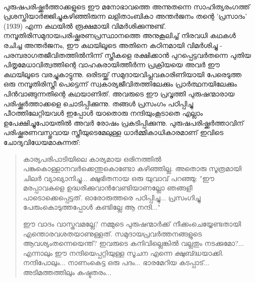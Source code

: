 \paragraph{}പുരുഷപരിഷ്ക്കർത്താക്കളുടെ ഈ മനോഭാവത്തെ അന്നുതന്നെ സാഹിത്യരംഗത്ത് പ്രശസ്തിയാർജ്ജിച്ചുകഴിഞ്ഞിരുന്ന ലളിതാംബികാ അന്തർജനം തന്റെ 'പ്രസാദം' (1939) എന്ന കഥയിൽ രൂക്ഷമായി വിമർശിക്കുന്നുണ്ട്. നമ്പൂതിരിസമുദായപരിഷ്ക്കരണപ്രസ്ഥാനത്തെ അനുകൂലിച്ച് നിരവധി കഥകൾ രചിച്ച അന്തർജനം, ഈ കഥയിലൂടെ അതിനെ കഠിനമായി വിമർശിച്ചു - പരമ്പരാഗതജീവിതത്തിൽനിന്ന് സ്ത്രീകളെ രക്ഷിക്കാൻ പുറപ്പെട്ടവർതന്നെ പുതിയ പിതൃമേധാവിത്വത്തിന്റെ വാഹകരായിത്തീർന്ന പ്രക്രിയയെ അവർ ഈ കഥയിലൂടെ വരച്ചുകാട്ടുന്നു. ഒരിടയ്ക്ക് സമുദായവിപ്ലവകാരിണിയായി പേരെടുത്ത ഒരു നമ്പൂതിരിസ്ത്രീ പെട്ടെന്ന് സ്വകാര്യജീവിതത്തിലേക്കും പ്രാർത്ഥനയിലേക്കും പിൻവാങ്ങുന്നതിന്റെ കഥയാണിത്. അവരുടെ ഈ പ്രവൃത്തി പുരുഷന്മാരായ പരിഷ്ക്കർത്താക്കളെ ചൊടിപ്പിക്കുന്നു. തങ്ങൾ പ്രസംഗം പഠിപ്പിച്ചു പീഠത്തിലേറ്റിയവൾ ഇപ്പോൾ യാതൊരു നന്ദിയുംകൂടാതെ എല്ലാം ഉപേക്ഷിച്ചുപോയതിൽ അവർ രോഷം പ്രകടിപ്പിക്കുന്നു. പുരുഷപരിഷ്ക്കർത്താവിന് പരിഷ്ക്കരണവസ്തുവായ സ്ത്രീയുടെമേലുള്ള ധാർമ്മികാധികാരമാണ് ഇവിടെ ചോദ്യവിധേയമാകുന്നത്:

\begin{quotation}
\noindent കാര്യപരിപാടിയിലെ കാര്യമായ ഒരിനത്തിൽ പങ്കുകൊള്ളാനവർക്കെന്തുകൊണ്ടോ കഴിഞ്ഞില്ല. അതൊരു സൂത്രമായി ചിലർ വ്യാഖ്യാനിച്ചു... ക്ഷുഭിതനായ ഒരു യുവാവ് പറഞ്ഞു: "ഈ മരപ്പാവകളെ ഉദ്ധരിക്കുവാൻവേണ്ടിയാണല്ലോ ഞങ്ങളീ പാടൊക്കെപ്പെട്ടത്. ഓരോരുത്തരെ പഠിപ്പിച്ചു... പ്രസംഗിച്ചു പേരുംകൊടുത്തപ്പോൾ കണ്ടില്ലേ ആ നന്ദി..."

\noindent
ഈ വാദം വാസ്തവമല്ലേ? നമ്മുടെ പുരുഷന്മാർക്ക് നീക്കംചെയ്യേണ്ടതായി എന്തൊരവശതയാണുള്ളത്. സമുദായപ്രവർത്തനങ്ങളുടെ ആവശ്യംതന്നെയെന്ത്? ഇവരുടെ കനിവില്ലെങ്കിൽ വല്ലതും നടക്കുമോ?... എന്നാലും ഈ നന്ദിയെപ്പറ്റിയുള്ള സൂചന എന്നെ ക്ഷുബ്ദ്ധയാക്കി. നന്ദിപോലും... നാണംകെട്ട ഒരു പദം... ഭാരമേറിയ കടപ്പാട്... അടിമത്തത്തിലും കഷ്ടതരം...

\end{quotation}


